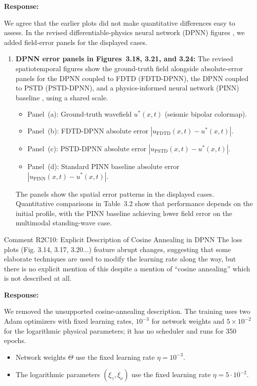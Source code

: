 \documentclass[11pt,a4paper]{article}
\newenvironment{response}{
    \par\vspace{1mm}\noindent\textbf{\textcolor{responseframe}{Response:}}\par\vspace{1mm}
}{
    \par\vspace{3mm}
}
\begin{document}
\begin{response}
We agree that the earlier plots did not make quantitative differences easy to assess. In the revised differentiable-physics neural network (DPNN) figures \citep{verburg_differentiable_2025}, we added field-error panels for the displayed cases.
\begin{enumerate}
    \item \textbf{DPNN error panels in Figures~3.18, 3.21, and 3.24:} The revised spatiotemporal figures show the ground-truth field alongside absolute-error panels for the DPNN coupled to FDTD (FDTD-DPNN), the DPNN coupled to PSTD (PSTD-DPNN), and a physics-informed neural network (PINN) baseline \citep{raissi_pinn_2019,haghighat_sciann_2021}, using a shared scale.
    \begin{itemize}
        \item Panel~(a): Ground-truth wavefield $u^*(x,t)$ (seismic bipolar colormap).
        \item Panel~(b): FDTD-DPNN absolute error $|u_{\mathrm{FDTD}}(x,t) - u^*(x,t)|$.
        \item Panel~(c): PSTD-DPNN absolute error $|u_{\mathrm{PSTD}}(x,t) - u^*(x,t)|$.
        \item Panel~(d): Standard PINN baseline absolute error $|u_{\mathrm{PINN}}(x,t) - u^*(x,t)|$.
    \end{itemize}
    The panels show the spatial error patterns in the displayed cases. Quantitative comparisons in Table~3.2 show that performance depends on the initial profile, with the PINN baseline achieving lower field error on the multimodal standing-wave case.
\end{enumerate}
\end{response}

\begin{revcomment}{Comment R2C10: Explicit Description of Cosine Annealing in DPNN}
The loss plots (Fig. 3.14, 3.17, 3.20...) feature abrupt changes, suggesting that some elaborate techniques are used to modify the learning rate along the way, but there is no explicit mention of this despite a mention of ``cosine annealing'' which is not described at all.
\end{revcomment}

\begin{response}
We removed the unsupported cosine-annealing description. The training uses two Adam optimizers with fixed learning rates, $10^{-3}$ for network weights and $5\times10^{-2}$ for the logarithmic physical parameters; it has no scheduler and runs for 350 epochs.
\begin{itemize}
    \item Network weights $\Theta$ use the fixed learning rate $\eta=10^{-3}$.
    \item The logarithmic parameters $(\xi_\gamma,\xi_\nu)$ use the fixed learning rate $\eta=5\cdot10^{-2}$.
\end{itemize}
\end{response}
\end{document}
